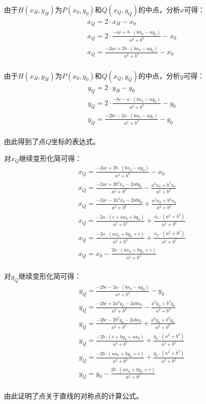 \documentclass[UTF8]{ctexart}
\begin{document}
    由于$H(x_H,y_H)$为$P(x_0,y_0)$和$Q(x_Q,y_Q)$的中点，分析$x$可得：\vspace{3pt}
    \begin{align}
        &x_Q=2\cdot x_H-x_0\\[3mm]
        &x_Q=2\cdot\frac{-ac+b\cdot(bx_0-ay_0)}{a^2+b^2}-x_0\\[3mm]
        &x_Q=\frac{-2ac+2b\cdot(bx_0-ay_0)}{a^2+b^2}-x_0
    \end{align}\\
    由于$H(x_H,y_H)$为$P(x_0,y_0)$和$Q(x_Q,y_Q)$的中点，分析$y$可得：\vspace{3pt}
    \begin{align}
        &y_Q=2\cdot y_H-y_0\\[3mm]
        &y_Q=2\cdot\frac{-bc-a\cdot(bx_0-ay_0)}{a^2+b^2}-y_0\\[3mm]
        &y_Q=\frac{-2bc-2a\cdot(bx_0-ay_0)}{a^2+b^2}-y_0
    \end{align}\\
    由此得到了点$Q$坐标的表达式。

\newpage

    对$x_Q$继续变形化简可得：
    \begin{align}
        &x_Q=\frac{-2ac+2b\cdot(bx_0-ay_0)}{a^2+b^2}-x_0\\[8mm]
        &x_Q=\frac{-2ac+2b^2x_0-2aby_0}{a^2+b^2}-\frac{a^2x_0+b^2x_0}{a^2+b^2}\\[8mm]
        &x_Q=\frac{-2ac-2a^2x_0-2aby_0}{a^2+b^2}+\frac{a^2x_0+b^2x_0}{a^2+b^2}\\[8mm]
        &x_Q=\frac{-2a\cdot(c+ax_0+by_0)}{a^2+b^2}+\frac{x_0\cdot(a^2+b^2)}{a^2+b^2}\\[8mm]
        &x_Q=\frac{-2a\cdot(ax_0+by_0+c)}{a^2+b^2}+\frac{x_0\cdot(a^2+b^2)}{a^2+b^2}\\[8mm]
        &x_Q=x_0-\frac{2a\cdot(ax_0+by_0+c)}{a^2+b^2}
    \end{align}\\
    对$y_Q$继续变形化简可得：
    \begin{align}
        &y_Q=\frac{-2bc-2a\cdot(bx_0-ay_0)}{a^2+b^2}-y_0\\[8mm]
        &y_Q=\frac{-2bc+2a^2y_0-2abx_0}{a^2+b^2}-\frac{a^2y_0+b^2y_0}{a^2+b^2}\\[8mm]
        &y_Q=\frac{-2bc-2b^2y_0-2abx_0}{a^2+b^2}+\frac{a^2y_0+b^2y_0}{a^2+b^2}\\[8mm]
        &y_Q=\frac{-2b\cdot(c+by_0+ax_0)}{a^2+b^2}+\frac{y_0\cdot(a^2+b^2)}{a^2+b^2}\\[8mm]
        &y_Q=\frac{-2b\cdot(ax_0+by_0+c)}{a^2+b^2}+\frac{y_0\cdot(a^2+b^2)}{a^2+b^2}\\[8mm]
        &y_Q=y_0-\frac{2b\cdot(ax_0+by_0+c)}{a^2+b^2}
    \end{align}\\
    由此证明了点关于直线的对称点的计算公式。
\end{document}
